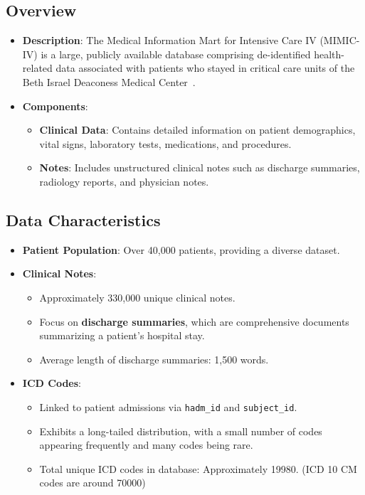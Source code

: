 \documentclass[12pt,a4paper]{report}
\begin{document}
\subsection{Overview}
\begin{itemize}
    \item \textbf{Description}: The Medical Information Mart for Intensive Care IV (MIMIC-IV) is a large, publicly available database comprising de-identified health-related data associated with patients who stayed in critical care units of the Beth Israel Deaconess Medical Center~\cite{johnson2016mimic}.
    \item \textbf{Components}:
    \begin{itemize}
        \item \textbf{Clinical Data}: Contains detailed information on patient demographics, vital signs, laboratory tests, medications, and procedures.
        \item \textbf{Notes}: Includes unstructured clinical notes such as discharge summaries, radiology reports, and physician notes.
    \end{itemize}
\end{itemize}

\subsection{Data Characteristics}
\begin{itemize}
    \item \textbf{Patient Population}: Over 40,000 patients, providing a diverse dataset.
    \item \textbf{Clinical Notes}:
    \begin{itemize}
        \item Approximately 330,000 unique clinical notes.
        \item Focus on \textbf{discharge summaries}, which are comprehensive documents summarizing a patient's hospital stay.
        \item Average length of discharge summaries: 1,500 words.
    \end{itemize}
    \item \textbf{ICD Codes}:
    \begin{itemize}
        \item Linked to patient admissions via \texttt{hadm\_id} and \texttt{subject\_id}.
        \item Exhibits a long-tailed distribution, with a small number of codes appearing frequently and many codes being rare.
        \item Total unique ICD codes in database: Approximately 19980. (ICD 10 CM codes are around 70000)
    \end{itemize}
\end{itemize}
\end{document}
